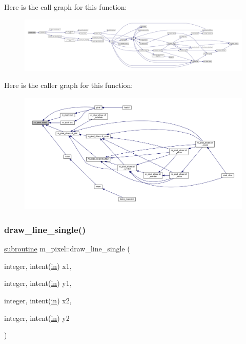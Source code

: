 Here is the call graph for this function\+:
\nopagebreak
\begin{figure}[H]
\begin{center}
\leavevmode
\includegraphics[width=350pt]{namespacem__pixel_a12012e819bb14b27d2b49732aa2e4e55_cgraph}
\end{center}
\end{figure}
Here is the caller graph for this function\+:
\nopagebreak
\begin{figure}[H]
\begin{center}
\leavevmode
\includegraphics[width=350pt]{namespacem__pixel_a12012e819bb14b27d2b49732aa2e4e55_icgraph}
\end{center}
\end{figure}
\mbox{\label{namespacem__pixel_a42791c7e58158616dae7c36ec5806717}} 
\subsubsection{\texorpdfstring{draw\+\_\+line\+\_\+single()}{draw\_line\_single()}}
{\footnotesize\ttfamily \hyperlink{M__stopwatch_83_8txt_acfbcff50169d691ff02d4a123ed70482}{subroutine} m\+\_\+pixel\+::draw\+\_\+line\+\_\+single (\begin{DoxyParamCaption}\item[{integer, intent(\hyperlink{M__journal_83_8txt_afce72651d1eed785a2132bee863b2f38}{in})}]{x1,  }\item[{integer, intent(\hyperlink{M__journal_83_8txt_afce72651d1eed785a2132bee863b2f38}{in})}]{y1,  }\item[{integer, intent(\hyperlink{M__journal_83_8txt_afce72651d1eed785a2132bee863b2f38}{in})}]{x2,  }\item[{integer, intent(\hyperlink{M__journal_83_8txt_afce72651d1eed785a2132bee863b2f38}{in})}]{y2 }\end{DoxyParamCaption})\hspace{0.3cm}{\ttfamily [private]}}



